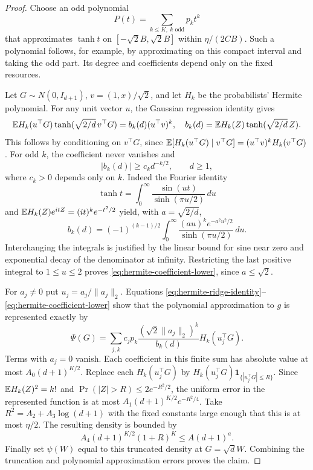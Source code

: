 \begin{proof}
Choose an odd polynomial
\[P(t)=\sum_{k\le K,\ k\text{ odd}}p_kt^k\]
that approximates $\tanh t$ on $[-\sqrt2B,\sqrt2B]$ within
$\eta/(2CB)$. Such a polynomial follows, for example, by approximating
on this compact interval and taking the odd part. Its degree and
coefficients depend only on the fixed resources.

Let $G\sim N(0,I_{d+1})$, $v=(1,x)/\sqrt2$, and let $H_k$ be the
probabilists' Hermite polynomial. For any unit vector $u$, the Gaussian
regression identity gives
\begin{equation}
 \mathbb E H_k(u^\top G)\tanh(\sqrt{2/d}\,v^\top G)
  =b_k(d)(u^\top v)^k,
 \quad b_k(d)=\mathbb E H_k(Z)\tanh(\sqrt{2/d}\,Z).
 \label{eq:hermite-ridge-identity}
\end{equation}
This follows by conditioning on $v^\top G$, since
$\mathbb E[H_k(u^\top G)\mid v^\top G]=
 (u^\top v)^kH_k(v^\top G)$.
For odd $k$, the coefficient never vanishes and
\begin{equation}
 |b_k(d)|\ge c_kd^{-k/2},\qquad d\ge1,
 \label{eq:hermite-coefficient-lower}
\end{equation}
where $c_k>0$ depends only on $k$. Indeed the Fourier identity
\[
 \tanh t=\int_0^\infty\frac{\sin(ut)}{\sinh(\pi u/2)}\,du
\]
and $\mathbb E H_k(Z)e^{itZ}=(it)^ke^{-t^2/2}$ yield, with
$a=\sqrt{2/d}$,
\[
 b_k(d)=(-1)^{(k-1)/2}
       \int_0^\infty\frac{(au)^ke^{-a^2u^2/2}}
                                {\sinh(\pi u/2)}\,du.
\]
Interchanging the integrals is justified by the linear bound for sine
near zero and exponential decay of the denominator at infinity.
Restricting the last positive integral to $1\le u\le2$ proves
\eqref{eq:hermite-coefficient-lower}, since $a\le\sqrt2$.

For $a_j\ne0$ put $u_j=a_j/\|a_j\|_2$. Equations
\eqref{eq:hermite-ridge-identity}--\eqref{eq:hermite-coefficient-lower}
show that the polynomial approximation to $g$ is represented exactly by
\[
 \Psi(G)=\sum_{j,k}c_jp_k
       \frac{(\sqrt2\|a_j\|_2)^k}{b_k(d)}H_k(u_j^\top G).
\]
Terms with $a_j=0$ vanish. Each coefficient in this finite sum has
absolute value at most $A_0(d+1)^{K/2}$.
Replace each $H_k(u_j^\top G)$ by
$H_k(u_j^\top G)\mathbf1_{\{|u_j^\top G|\le R\}}$.
Since $\mathbb E H_k(Z)^2=k!$ and
$\Pr(|Z|>R)\le2e^{-R^2/2}$, the uniform error in the represented
function is at most $A_1(d+1)^{K/2}e^{-R^2/4}$.
Take $R^2=A_2+A_3\log(d+1)$ with the fixed constants large enough
that this is at most $\eta/2$. The resulting density is bounded by
\[
 A_4(d+1)^{K/2}(1+R)^K\le A(d+1)^a.
\]
Finally set $\psi(W)$ equal to this truncated density at $G=\sqrt dW$.
Combining the truncation and polynomial approximation errors proves the
claim.
\end{proof}
